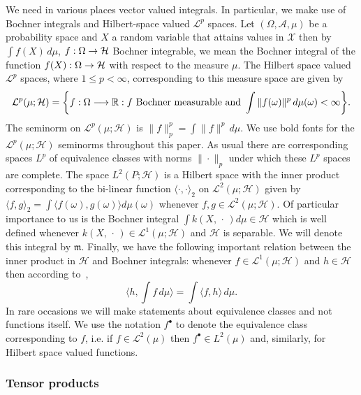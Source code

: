\documentclass[10pt]{amsart}
\theoremstyle{definition}\newtheorem{defi}[theo]{Definition}\newtheorem{rema}[theo]{Remark}\newtheorem{exam}[theo]{Example}\newtheorem{exem}[theo]{Example}\newtheorem{nota}[theo]{Notation}
\theoremstyle{remark}
\newcommand{\R}{\mathbb{R}}
\newcommand{\X}{\mathcal{X}}
\newcommand{\clA}{\mathcal{A}}
\newcommand{\cH}{\mathcal{H}}
\newcommand{\clL}{\mathcal{L}}
\newcommand{\mean}{\mathfrak{m}}
\newcommand{\bn}{\bm{\|}}
\newcommand{\bl}{\bm{\langle}}
\newcommand{\br}{\bm{\rangle}_{2}}
\renewcommand*{\to}{\mathchoice{\longrightarrow}{\rightarrow}{\rightarrow}{\rightarrow}}
\let\originalleft\left
\let\originalright\right
\renewcommand{\left}{\mathopen{}\mathclose\bgroup\originalleft}
\renewcommand{\right}{\aftergroup\egroup\originalright}
\begin{document}
We need in various places vector valued integrals. In particular, we make use of Bochner integrals and Hilbert-space valued $\clL^p$ spaces. Let $(\Omega,\clA,\mu)$ be a probability space and $X$ a random variable that attains values in $\X$ then by $\int f(X) \,d\mu$, $f:\Omega \to \cH$ Bochner integrable, we mean the Bochner integral of the function $f(X) : \Omega \to \cH$ with respect to the measure $\mu$. The Hilbert space valued $\clL^p$ spaces, where $1\leq p < \infty$, corresponding to this measure space are given by
\[
\clL^p(\mu; \cH) = \left\{f: \Omega \to \R : f \text{ Bochner measurable and } \int \|f(\omega)\|^p \, d\mu(\omega) < \infty \right\}.
\]
The seminorm on $\clL^p(\mu;\cH)$ is $\bn f \bn_p^p = \int \|f\|^p \, d\mu$. We use bold fonts for the $\clL^p(\mu; \cH)$ seminorms throughout this paper. As usual there are corresponding spaces $L^p$ of equivalence classes with norms $\bn \cdot \bn_p$ under which these $L^p$ spaces are complete. The space $L^2(P;\cH)$ is a Hilbert space with the inner product corresponding to the bi-linear function $\bl \cdot, \cdot \br$ on $\clL^2(\mu;\cH)$ given by $\bl f,g \br = \int \langle f(\omega),g(\omega)\rangle d\mu(\omega)$ whenever $f,g \in \clL^2(\mu;\cH)$. Of particular importance to us is the Bochner integral $\int k(X,\,\cdot\,) d\mu \in \cH$ which is well defined whenever $k(X,\,\cdot\,) \in \clL^1(\mu;\cH)$ and $\cH$ is separable. We will denote this integral by $\mean$. Finally, we have the following important relation between the inner product in $\cH$ and Bochner integrals: whenever $f \in \clL^1(\mu;\cH)$ and $h\in \cH$ then according to~\cite[Theorem~6, p.~47]{DIES77},
\[
\langle h, \int f \, d\mu \rangle = \int \langle f,h\rangle \, d\mu.
\]
In rare occasions we will make statements about equivalence classes and not functions itself. We use the notation $f^\bullet$ to denote the equivalence class corresponding to $f$, i.e. if $f \in \clL^2(\mu)$ then $f^\bullet \in L^2(\mu)$ and, similarly, for Hilbert space valued functions.



\subsubsection{Tensor products}
\end{document}
